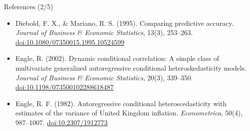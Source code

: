 \begin{frame}{References (2/5)}
\begin{itemize}
    \item Diebold, F. X., \& Mariano, R. S. (1995). Comparing predictive accuracy. \textit{Journal of Business \& Economic Statistics}, 13(3), 253--263. \href{https://doi.org/10.1080/07350015.1995.10524599}{doi:10.1080/07350015.1995.10524599}
    \item Engle, R. (2002). Dynamic conditional correlation: A simple class of multivariate generalized autoregressive conditional heteroskedasticity models. \textit{Journal of Business \& Economic Statistics}, 20(3), 339--350. \href{https://doi.org/10.1198/073500102288618487}{doi:10.1198/073500102288618487}
    \item Engle, R. F. (1982). Autoregressive conditional heteroscedasticity with estimates of the variance of United Kingdom inflation. \textit{Econometrica}, 50(4), 987--1007. \href{https://doi.org/10.2307/1912773}{doi:10.2307/1912773}
\end{itemize}
\end{frame}


